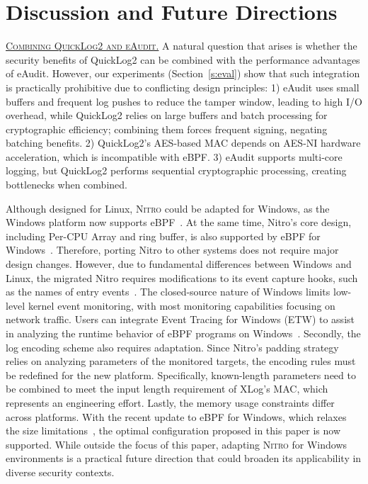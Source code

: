 \documentclass[sigconf]{sty/acmart}
\newcommand{\Sys}{\mbox{\textsc{Nitro}}\xspace}
\newcommand{\qltwo}{QuickLog2\xspace}
\newcommand{\ed}{eAudit\xspace}
\newcommand{\heading}[1]{\vspace{6pt}\noindent{\underline{\textsc{#1}}}}
\newcommand{\noskipheading}[1]{\noindent\textsc{\underline{#1}}}
\begin{document}
\section{Discussion and Future Directions}
\label{sec:discussion}

\noskipheading{Combining \qltwo and \ed.} A natural question that arises is whether the security benefits of QuickLog2 can be combined with the performance advantages of eAudit. However, our experiments (Section~\ref{s:eval}) show that such integration is practically prohibitive due to conflicting design principles: 1) eAudit uses small buffers and frequent log pushes to reduce the tamper window, leading to high I/O overhead, while QuickLog2 relies on large buffers and batch processing for cryptographic efficiency; combining them forces frequent signing, negating batching benefits. 2) QuickLog2’s AES-based MAC depends on AES-NI hardware acceleration, which is incompatible with eBPF. 3) eAudit supports multi-core logging, but QuickLog2 performs sequential cryptographic processing, creating bottlenecks when combined.

\heading{Cross-Platform Portability.} Although designed for Linux, \Sys could be adapted for Windows, as the Windows platform now supports eBPF~\cite{microsoft2024ebpf}. At the same time, Nitro's core design, including Per-CPU Array and ring buffer, is also supported by eBPF for Windows~\cite{ebpf_windows_file_reference,ebpf_windows_official_intro}. Therefore, porting Nitro to other systems does not require major design changes. However, due to fundamental differences between Windows and Linux, the migrated Nitro requires modifications to its event capture hooks, such as the names of entry events~\cite{ebpf_windows_tutorial}. The closed-source nature of Windows limits low-level kernel event monitoring, with most monitoring capabilities focusing on network traffic. Users can integrate Event Tracing for Windows (ETW) to assist in analyzing the runtime behavior of eBPF programs on Windows~\cite{ebpf_windows_ETW}. Secondly, the log encoding scheme also requires adaptation. Since Nitro’s padding strategy relies on analyzing parameters of the monitored targets, the encoding rules must be redefined for the new platform. Specifically, known-length parameters need to be combined to meet the input length requirement of XLog’s MAC, which represents an engineering effort. Lastly, the memory usage constraints differ across platforms. With the recent update to eBPF for Windows, which relaxes the size limitations~\cite{microsoft2024ebpf}, the optimal configuration proposed in this paper is now supported.
 While outside the focus of this paper, adapting \Sys for Windows environments is a practical future direction that could broaden its applicability in diverse security contexts.
\end{document}
